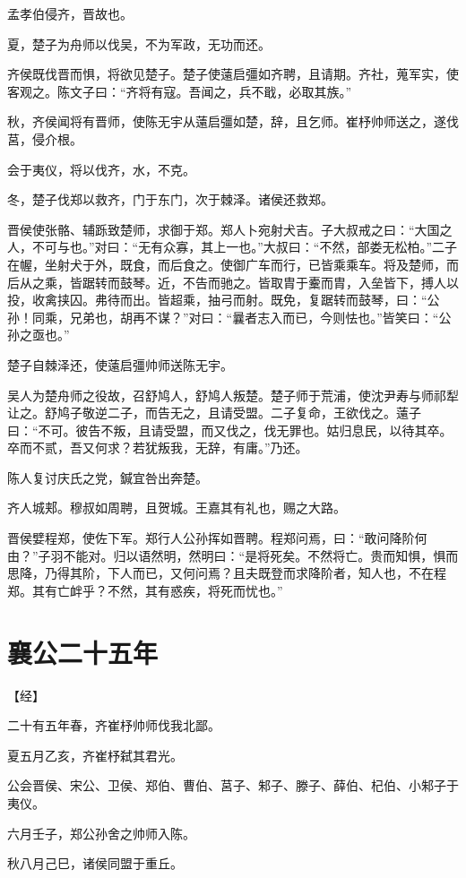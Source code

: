 \documentclass[a4paper,12pt,UTF8,twoside]{ctexbook}
\begin{document}
孟孝伯侵齐，晋故也。

夏，楚子为舟师以伐吴，不为军政，无功而还。

齐侯既伐晋而惧，将欲见楚子。楚子使薳启彊如齐聘，且请期。齐社，蒐军实，使客观之。陈文子曰：“齐将有寇。吾闻之，兵不戢，必取其族。”

秋，齐侯闻将有晋师，使陈无宇从薳启彊如楚，辞，且乞师。崔杼帅师送之，遂伐莒，侵介根。

会于夷仪，将以伐齐，水，不克。

冬，楚子伐郑以救齐，门于东门，次于棘泽。诸侯还救郑。

晋侯使张骼、辅跞致楚师，求御于郑。郑人卜宛射犬吉。子大叔戒之曰：“大国之人，不可与也。”对曰：“无有众寡，其上一也。”大叔曰：“不然，部娄无松柏。”二子在幄，坐射犬于外，既食，而后食之。使御广车而行，已皆乘乘车。将及楚师，而后从之乘，皆踞转而鼓琴。近，不告而驰之。皆取胄于櫜而胄，入垒皆下，搏人以投，收禽挟囚。弗待而出。皆超乘，抽弓而射。既免，复踞转而鼓琴，曰：“公孙！同乘，兄弟也，胡再不谋？”对曰：“曩者志入而已，今则怯也。”皆笑曰：“公孙之亟也。”

楚子自棘泽还，使薳启彊帅师送陈无宇。

吴人为楚舟师之役故，召舒鸠人，舒鸠人叛楚。楚子师于荒浦，使沈尹寿与师祁犁让之。舒鸠子敬逆二子，而告无之，且请受盟。二子复命，王欲伐之。薳子曰：“不可。彼告不叛，且请受盟，而又伐之，伐无罪也。姑归息民，以待其卒。卒而不贰，吾又何求？若犹叛我，无辞，有庸。”乃还。

陈人复讨庆氏之党，鍼宜咎出奔楚。

齐人城郏。穆叔如周聘，且贺城。王嘉其有礼也，赐之大路。

晋侯嬖程郑，使佐下军。郑行人公孙挥如晋聘。程郑问焉，曰：“敢问降阶何由？”子羽不能对。归以语然明，然明曰：“是将死矣。不然将亡。贵而知惧，惧而思降，乃得其阶，下人而已，又何问焉？且夫既登而求降阶者，知人也，不在程郑。其有亡衅乎？不然，其有惑疾，将死而忧也。”

\chapter{襄公二十五年}



【经】

二十有五年春，齐崔杼帅师伐我北鄙。

夏五月乙亥，齐崔杼弑其君光。

公会晋侯、宋公、卫侯、郑伯、曹伯、莒子、邾子、滕子、薛伯、杞伯、小邾子于夷仪。

六月壬子，郑公孙舍之帅师入陈。

秋八月己巳，诸侯同盟于重丘。
\end{document}
